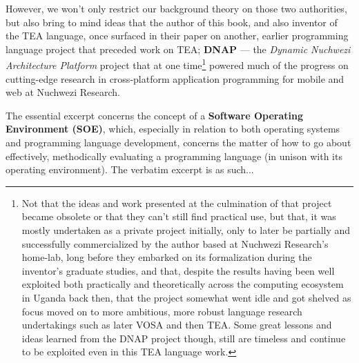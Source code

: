 \documentclass[a4paper, 18pt]{book} %
\begin{document}
{{{However, we won't only restrict our background theory on those two authorities, but also bring to mind ideas that the author of this book, and also inventor of the TEA language, once surfaced in their paper on another, earlier programming language project that preceded work on TEA; \textbf{DNAP} --- the \textit{Dynamic Nuchwezi Architecture Platform} project \cite{lutalo2023dnapsoe} that at one time\footnote{Not that the ideas and work presented at the culmination of that project became obsolete or that they can't still find practical use, but that, it was mostly undertaken as a private project initially, only to later be partially and successfully commercialized by the author based at Nuchwezi Research's home-lab, long before they embarked on its formalization during the inventor's graduate studies, and that, despite the results having been well exploited both practically and theoretically across the computing ecosystem in Uganda back then, that the project somewhat went idle and got shelved as focus moved on to more ambitious, more robust language research undertakings such as later VOSA\cite{lutalo2024vosa} and then TEA. Some great lessons and ideas learned from the DNAP project though, still are timeless and continue to be exploited even in this TEA language work.} powered much of the progress on cutting-edge research in cross-platform application programming for mobile and web\cite{lutalo2023dnapsoe, lutalodnapintro2020, a2021_github} at Nuchwezi Research.

\vspace{2em}

The essential excerpt concerns the concept of a \textbf{Software Operating Environment (SOE)}, which, especially in relation to both operating systems and programming language development, concerns the matter of how to go about effectively, methodically evaluating a programming language (in unison with its operating environment). The verbatim excerpt is as such...

\vspace{2em}

}}}
\end{document}
